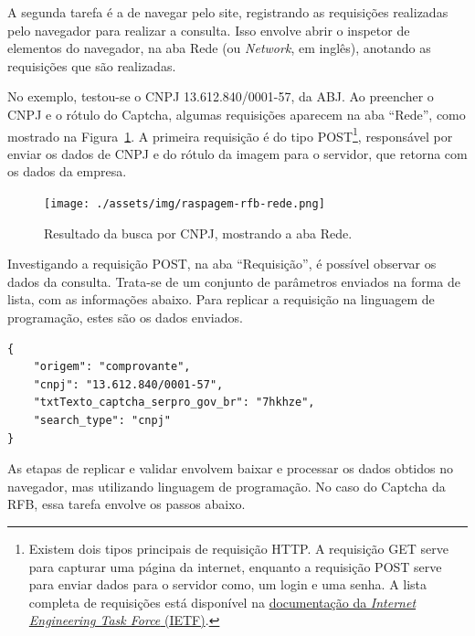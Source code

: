 \documentclass[12pt,twoside,brazilian]{book}
\begin{document}
A segunda tarefa é a de navegar pelo site, registrando as requisições
realizadas pelo navegador para realizar a consulta. Isso envolve abrir o
inspetor de elementos do navegador, na aba Rede (ou \emph{Network}, em
inglês), anotando as requisições que são realizadas.

No exemplo, testou-se o CNPJ 13.612.840/0001-57, da ABJ. Ao preencher o
CNPJ e o rótulo do Captcha, algumas requisições aparecem na aba
``Rede'', como mostrado na Figura~\ref{fig-raspagem-rfb-rede}. A
primeira requisição é do tipo POST\footnote{Existem dois tipos
  principais de requisição HTTP. A requisição GET serve para capturar
  uma página da internet, enquanto a requisição POST serve para enviar
  dados para o servidor como, um login e uma senha. A lista completa de
  requisições está disponível na
  \href{https://www.rfc-editor.org/rfc/rfc9110.html}{documentação da
  \emph{Internet Engineering Task Force} (IETF)}.}, responsável por
enviar os dados de CNPJ e do rótulo da imagem para o servidor, que
retorna com os dados da empresa.

\begin{figure}

{\centering \texttt{[image: ./assets/img/raspagem-rfb-rede.png]}

}

\caption{\label{fig-raspagem-rfb-rede}Resultado da busca por CNPJ,
mostrando a aba Rede.}

\end{figure}

Investigando a requisição POST, na aba ``Requisição'', é possível
observar os dados da consulta. Trata-se de um conjunto de parâmetros
enviados na forma de lista, com as informações abaixo. Para replicar a
requisição na linguagem de programação, estes são os dados enviados.

\begin{verbatim}
{
    "origem": "comprovante",
    "cnpj": "13.612.840/0001-57",
    "txtTexto_captcha_serpro_gov_br": "7hkhze",
    "search_type": "cnpj"
}
\end{verbatim}

As etapas de replicar e validar envolvem baixar e processar os dados
obtidos no navegador, mas utilizando linguagem de programação. No caso
do Captcha da RFB, essa tarefa envolve os passos abaixo.
\end{document}
